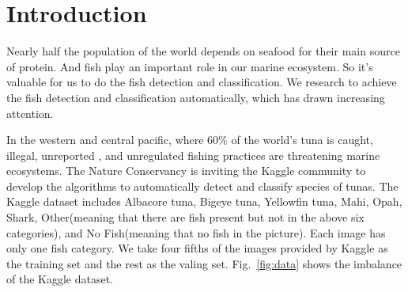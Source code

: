 \documentclass[conference]{IEEEtran}
\begin{document}



%
\IEEEpeerreviewmaketitle








\section{Introduction}



Nearly half the population of the world depends on seafood for their main source of protein. And fish play an important role in our marine ecosystem. So it's valuable for us to do the fish detection and classification. We research to achieve the fish detection and classification automatically, which has drawn increasing attention. \par

In the western and central pacific, where 60\% of the world's tuna is caught, illegal, unreported , and unregulated fishing practices are threatening marine ecosystems. The Nature Conservancy is inviting the Kaggle community to develop the algorithms to automatically detect and classify species of tunas. The Kaggle dataset includes Albacore tuna, Bigeye tuna, Yellowfin tuna, Mahi, Opah, Shark, Other(meaning that there are fish present but not in the above six categories), and No Fish(meaning that no fish in the picture). Each image has only one fish category. We take four fifths of the images provided by Kaggle as the training set and the rest as the valing set. Fig.~\ref{fig:data} shows the imbalance of the Kaggle dataset.\par
\end{document}
